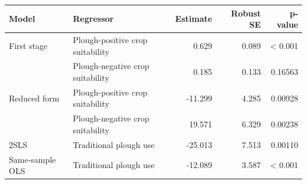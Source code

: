 
\begin{tabular}{llrrr}
\toprule
Model & Regressor & Estimate & Robust SE & p-value\\
\midrule
First stage & Plough-positive crop suitability & 0.629 & 0.089 & < 0.001\\
 & Plough-negative crop suitability & 0.185 & 0.133 & 0.16563\\
Reduced form & Plough-positive crop suitability & -11.299 & 4.285 & 0.00928\\
 & Plough-negative crop suitability & 19.571 & 6.329 & 0.00238\\
2SLS & Traditional plough use & -25.013 & 7.513 & 0.00110\\
\addlinespace
Same-sample OLS & Traditional plough use & -12.089 & 3.587 & < 0.001\\
\bottomrule
\end{tabular}
